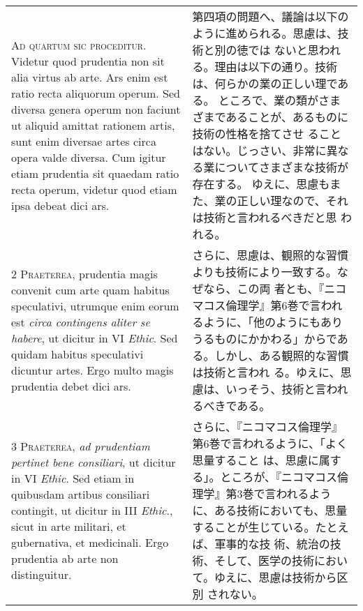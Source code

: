 \documentclass[10pt]{jsarticle}
\begin{document}
\begin{longtable}{p{21em}p{21em}}

{\huge A}{\scshape d quartum sic proceditur}. Videtur quod prudentia
 non sit alia virtus ab arte. Ars enim est ratio recta aliquorum
 operum. Sed diversa genera operum non faciunt ut aliquid amittat
 rationem artis, sunt enim diversae artes circa opera valde
 diversa. Cum igitur etiam prudentia sit quaedam ratio recta operum,
 videtur quod etiam ipsa debeat dici ars.

&

第四項の問題へ、議論は以下のように進められる。思慮は、技術と別の徳では
ないと思われる。理由は以下の通り。技術は、何らかの業の正しい理である。
ところで、業の類がさまざまであることが、あるものに技術の性格を捨てさせ
ることはない。じっさい、非常に異なる業についてさまざまな技術が存在する。
ゆえに、思慮もまた、業の正しい理なので、それは技術と言われるべきだと思
われる。

\\

{\scshape 2 Praeterea}, prudentia magis convenit cum arte quam habitus
speculativi, utrumque enim eorum est {\itshape circa contingens aliter
se habere}, ut dicitur in VI {\itshape Ethic}. Sed quidam habitus
speculativi dicuntur artes. Ergo multo magis prudentia debet dici ars.

&

さらに、思慮は、観照的な習慣よりも技術により一致する。なぜなら、この両
者とも、『ニコマコス倫理学』第6巻で言われるように、「他のようにもあり
うるものにかかわる」からである。しかし、ある観照的な習慣は技術と言われ
る。ゆえに、思慮は、いっそう、技術と言われるべきである。

\\

{\scshape 3 Praeterea}, {\itshape ad prudentiam pertinet bene
consiliari}, ut dicitur in VI {\itshape Ethic}. Sed etiam in quibusdam
artibus consiliari contingit, ut dicitur in III {\itshape Ethic}.,
sicut in arte militari, et gubernativa, et medicinali. Ergo prudentia
ab arte non distinguitur.

&

さらに、『ニコマコス倫理学』第6巻で言われるように、「よく思量すること
は、思慮に属する」。ところが、『ニコマコス倫理学』第3巻で言われるよう
に、ある技術においても、思量することが生じている。たとえば、軍事的な技
術、統治の技術、そして、医学の技術において。ゆえに、思慮は技術から区別
されない。

\\


\end{longtable}
\end{document}
